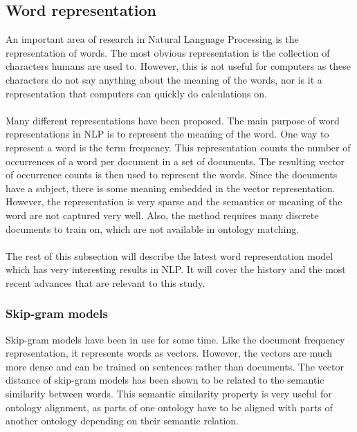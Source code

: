 \documentclass{article}
\begin{document}
 \subsection{Word representation} \label{w2v}
 An important area of research in Natural Language Processing is the representation of words. The most obvious representation is the collection of characters humans are used to. However, this is not useful for computers as these characters do not say anything about the meaning of the words, nor is it a representation that computers can quickly do calculations on.
 \paragraph{}
 Many different representations have been proposed. The main purpose of word representations in NLP is to represent the meaning of the word. One way to represent a word is the term frequency. This representation counts the number of occurrences of a word per document in a set of documents. The resulting vector of occurrence counts is then used to represent the words. Since the documents have a subject, there is some meaning embedded in the vector representation. However, the representation is very sparse and the semantics or meaning of the word are not captured very well. Also, the method requires many discrete documents to train on, which are not available in ontology matching.
 \paragraph{}
 The rest of this subsection will describe the latest word representation model which has very interesting results in NLP. It will cover the history and the most recent advances that are relevant to this study.
 
 \subsubsection{Skip-gram models}
 Skip-gram models have been in use for some time. Like the document frequency representation, it represents words as vectors. However, the vectors are much more dense and can be trained on sentences rather than documents. The vector distance of skip-gram models has been shown to be related to the semantic similarity between words. This semantic similarity property is very useful for ontology alignment, as parts of one ontology have to be aligned with parts of another ontology depending on their semantic relation.
  
\end{document}
